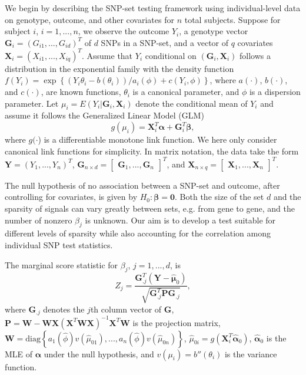 \documentclass[12pt]{article}
\begin{document}
We begin by describing the SNP-set testing framework using individual-level data on 
genotype, outcome, and other covariates for $n$ total subjects.
Suppose for subject $i$, $i=1,...,n$, we observe the outcome $Y_{i}$, a genotype vector 
$\mathbf{G}_{i}=(G_{i1},...,G_{id})^{T}$ of $d$ SNPs in a SNP-set, and a vector of $q$ 
covariates $\mathbf{X}_{i}=(X_{i1},...,X_{iq})^{T}$.
Assume that $Y_{i}$ conditional on $(\mathbf{G}_{i},\mathbf{X}_{i})$ follows a distribution 
in the exponential family \citep{GLM} with the density function 
$f(Y_{i})=\exp\left\{ (Y_{i}\theta_{i}-b(\theta_{i}))/a_{i}(\phi)+c(Y_{i},\phi)\right\} $, where  
$a(\cdot)$, $b(\cdot)$, and $c(\cdot)$, are known functions, $\theta_{i}$ is a canonical 
parameter, and $\phi$ is a dispersion parameter. 
Let $\mu_{i}=E(Y_{i}|\mathbf{G}_{i},\mathbf{X}_{i})$ denote the conditional mean of 
$Y_{i}$ and assume it follows the Generalized Linear Model (GLM)
\[
g(\mu_{i})=\mathbf{X}_{i}^{T}\boldsymbol{\alpha}+\mathbf{G}_{i}^{T}\boldsymbol{\beta},
\]
where $g(\cdot$) is a differentiable monotone link function. 
We here only consider canonical link functions for simplicity. In matrix notation, the  
data take the form $\mathbf{Y}=(Y_{1},...,Y_{n})^{T}$,
$\mathbf{G}_{n\times d}=[\begin{array}{ccccc} \mathbf{G}_{1},..., \mathbf{G}_{n}\end{array}]^{T}$, 
and $\mathbf{X}_{n\times q}=[\begin{array}{ccccc} \mathbf{X}_{1},..., \mathbf{X}_{n}\end{array}]^{T}.$


The null hypothesis of no association between a SNP-set and outcome, after controlling 
for covariates, is given by $H_{0}:\boldsymbol{\beta}=\mathbf{0}$.  
Both the size of the set $d$ and the sparsity of signals can vary greatly between sets, 
e.g. from gene to gene, and the number of nonzero $\beta_{j}$ is unknown.
Our aim is to develop a test suitable for different levels of sparsity while also accounting 
for the correlation among individual SNP test statistics.


The marginal score statistic for $\beta_{j}$, $j=1,...,d$, is 
\[
Z_{j}=\frac{\mathbf{G}_{.j}^{T}(\mathbf{Y}-\widehat{\boldsymbol{\mu}}_{0})}{\sqrt{\mathbf{G}_{.j}^{T}\mathbf{P}\mathbf{G}_{.j}}},
\]
where $\mathbf{G}_{.j}$ denotes the $j$th column vector of $\mathbf{G}$, 
$\mathbf{P}=\mathbf{W}-\mathbf{W}\mathbf{X}(\mathbf{X}^{T}\mathbf{W}\mathbf{X})^{-1}\mathbf{X}^{T}\mathbf{W}$ 
is the projection matrix,
$\mathbf{W}=\text{diag}\left\{ a_{1}(\widehat{\phi}) v(\widehat{\mu}_{01}),...,a_{n}(\widehat{\phi}) v(\widehat{\mu}_{0n})\right\}$,
$\widehat{\mu}_{0i}=g(\mathbf{X}_{i}^{T}\widehat{\boldsymbol{\alpha}}_{0})$,
$\widehat{\boldsymbol{\alpha}}_{0}$ is the MLE of $\boldsymbol{\alpha}$
under the null hypothesis, and $v(\mu_{i})=b''(\theta_{i})$
is the variance function.
\end{document}
